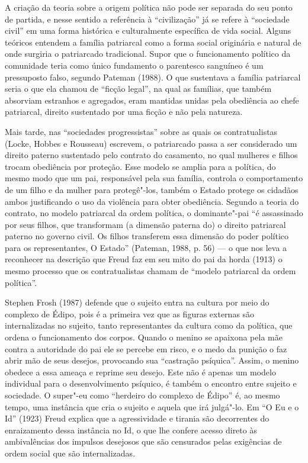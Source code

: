 A criação da teoria sobre a origem política não pode ser separada do seu
ponto de partida, e nesse sentido a referência à ``civilização'' já se
refere à ``sociedade civil'' em uma forma histórica e culturalmente
específica de vida social. Alguns teóricos entendem a família patriarcal
como a forma social originária e natural de onde surgiria o patriarcado
tradicional. Supor que o funcionamento político da comunidade teria como
único fundamento o parentesco sanguíneo é um pressuposto falso, segundo
Pateman (1988). O que sustentava a família patriarcal seria o que ela
chamou de ``ficção legal'', na qual as famílias, que também absorviam
estranhos e agregados, eram mantidas unidas pela obediência ao chefe
patriarcal, direito sustentado por uma ficção e não pela natureza.

Mais tarde, nas ``sociedades progressistas'' sobre as quais os
contratualistas (Locke, Hobbes e Rousseau) escrevem, o patriarcado passa
a ser considerado um direito paterno sustentado pelo contrato do
casamento, no qual mulheres e filhos trocam obediência por proteção.
Esse modelo se amplia para a política, do mesmo modo que um pai,
responsável pela sua família, controla o comportamento de um filho e da
mulher para protegê"-los, também o Estado protege os cidadãos ambos
justificando o uso da violência para obter obediência. Segundo a teoria
do contrato, no modelo patriarcal da ordem política, o dominante"-pai ``é
assassinado por seus filhos, que transformam (a dimensão paterna do) o
direito patriarcal paterno no governo civil. Os filhos transferem essa
dimensão do poder político para os representantes, O Estado'' (Pateman,
1988, p. 56) --- o que nos leva a reconhecer na descrição que Freud faz
em seu mito do pai da horda (1913) o mesmo processo que os
contratualistas chamam de ``modelo patriarcal da ordem política''.

Stephen Frosh (1987) defende que o sujeito entra na cultura por meio do
complexo de Édipo, pois é a primeira vez que as figuras externas são
internalizadas no sujeito, tanto representantes da cultura como da
política, que ordena o funcionamento dos corpos. Quando o menino se
apaixona pela mãe contra a autoridade do pai ele se percebe em risco, e
o medo da punição o faz abrir mão de seus desejos, provocando sua
``castração psíquica''. Assim, o menino obedece a essa ameaça e reprime
seu desejo. Este não é apenas um modelo individual para o
desenvolvimento psíquico, é também o encontro entre sujeito e sociedade.
O super"-eu como ``herdeiro do complexo de Édipo'' é, ao mesmo tempo, uma
instância que cria o sujeito e aquela que irá julgá"-lo. Em ``O Eu e o Id''
(1923) Freud explica que a agressividade e tirania são decorrentes do
enraizamento dessa instância no Id, o que lhe confere acesso direto às
ambivalências dos impulsos desejosos que são censurados pelas exigências
de ordem social que são internalizadas.

